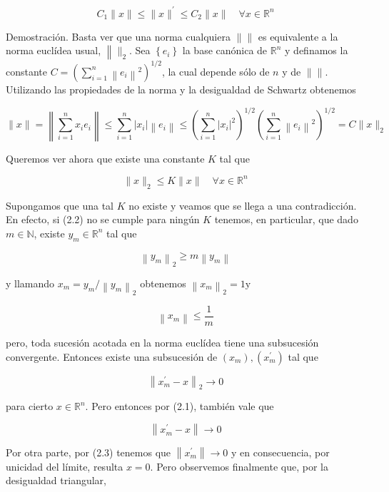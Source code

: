 \documentclass[10pt]{article}
\begin{document}
$$
C_{1}\|x\| \leq\|x\|^{\prime} \leq C_{2}\|x\| \quad \forall x \in \mathbb{R}^{n}
$$

Demostración. Basta ver que una norma cualquiera $\|\|$ es equivalente a la norma euclídea usual, $\left\|\|_{2}\right.$. Sea $\left\{e_{i}\right\}$ la base canónica de $\mathbb{R}^{n}$ y definamos la constante $C=\left(\sum_{i=1}^{n}\left\|e_{i}\right\|^{2}\right)^{1 / 2}$, la cual depende sólo de $n$ y de $\|\|$. Utilizando las propiedades de la norma y la desigualdad de Schwartz obtenemos


\begin{equation*}
\|x\|=\left\|\sum_{i=1}^{n} x_{i} e_{i}\right\| \leq \sum_{i=1}^{n}\left|x_{i}\right|\left\|e_{i}\right\| \leq\left(\sum_{i=1}^{n}\left|x_{i}\right|^{2}\right)^{1 / 2}\left(\sum_{i=1}^{n}\left\|e_{i}\right\|^{2}\right)^{1 / 2}=C\|x\|_{2} \tag{2.1}
\end{equation*}


Queremos ver ahora que existe una constante $K$ tal que


\begin{equation*}
\|x\|_{2} \leq K\|x\| \quad \forall x \in \mathbb{R}^{n} \tag{2.2}
\end{equation*}


Supongamos que una tal $K$ no existe y veamos que se llega a una contradicción. En efecto, si (2.2) no se cumple para ningún $K$ tenemos, en particular, que dado $m \in \mathbb{N}$, existe $y_{m} \in \mathbb{R}^{n}$ tal que

$$
\left\|y_{m}\right\|_{2} \geq m\left\|y_{m}\right\|
$$

y llamando $x_{m}=y_{m} /\left\|y_{m}\right\|_{2}$ obtenemos $\left\|x_{m}\right\|_{2}=1 \mathrm{y}$


\begin{equation*}
\left\|x_{m}\right\| \leq \frac{1}{m} \tag{2.3}
\end{equation*}


pero, toda sucesión acotada en la norma euclídea tiene una subsucesión convergente. Entonces existe una subsucesión de $\left(x_{m}\right),\left(x_{m}^{\prime}\right)$ tal que

$$
\left\|x_{m}^{\prime}-x\right\|_{2} \rightarrow 0
$$

para cierto $x \in \mathbb{R}^{n}$. Pero entonces por (2.1), también vale que

$$
\left\|x_{m}^{\prime}-x\right\| \rightarrow 0
$$

Por otra parte, por (2.3) tenemos que $\left\|x_{m}^{\prime}\right\| \rightarrow 0$ y en consecuencia, por unicidad del límite, resulta $x=0$. Pero observemos finalmente que, por la desigualdad triangular,
\end{document}
